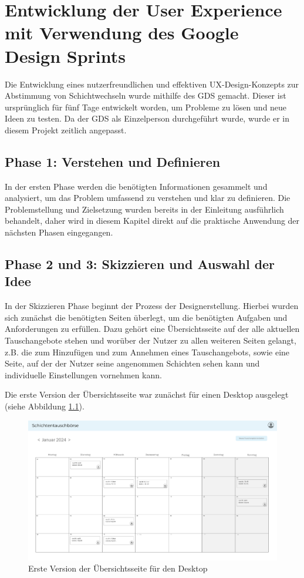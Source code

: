 \chapter{Entwicklung der User Experience mit Verwendung des Google Design Sprints}

Die Entwicklung eines nutzerfreundlichen und effektiven UX-Design-Konzepts zur Abstimmung von Schichtwechseln wurde mithilfe des GDS gemacht. Dieser ist ursprünglich für fünf Tage entwickelt worden, um Probleme zu lösen und neue Ideen zu testen. Da der GDS als Einzelperson durchgeführt wurde, wurde er in diesem Projekt zeitlich angepasst.

\section{Phase 1: Verstehen und Definieren}
In der ersten Phase werden die benötigten Informationen gesammelt und analysiert, um das Problem umfassend zu verstehen und klar zu definieren. Die Problemstellung und Zielsetzung wurden bereits in der Einleitung ausführlich behandelt, daher wird in diesem Kapitel direkt auf die praktische Anwendung der nächsten Phasen eingegangen.

\section{Phase 2 und 3: Skizzieren und Auswahl der Idee}
In der Skizzieren Phase beginnt der Prozess der Designerstellung. Hierbei wurden sich zunächst die benötigten Seiten überlegt, um die benötigten Aufgaben und Anforderungen zu erfüllen. Dazu gehört eine Übersichtsseite auf der alle aktuellen Tauschangebote stehen und worüber der Nutzer zu allen weiteren Seiten gelangt, z.B. die zum Hinzufügen und zum Annehmen eines Tauschangebots, sowie eine Seite, auf der der Nutzer seine angenommen Schichten sehen kann und individuelle Einstellungen vornehmen kann. 

Die erste Version der Übersichtsseite war zunächst für einen Desktop ausgelegt (siehe Abbildung \ref{Version1_Desktop}). 

\begin{figure}[h]
    \centering
    \includegraphics[clip,width=0.9\linewidth]{images/Version1_Desktop.png}
    \caption[Erste Version der Übersichtsseite für den Desktop]{Erste Version der Übersichtsseite für den Desktop}
    \label{Version1_Desktop}
\end{figure}

